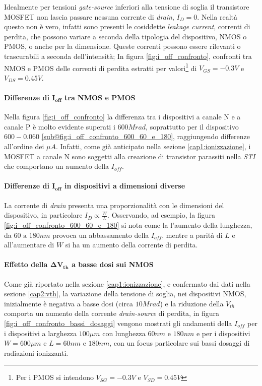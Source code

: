 Idealmente per tensioni \textit{gate-source} inferiori alla tensione di soglia il transistore MOSFET non lascia passare nessuna corrente di \textit{drain}, $I_D = 0$. Nella realtà questo non è vero, infatti sono presenti le cosiddette \textit{leakage current}, correnti di perdita, che possono variare a seconda della tipologia del dispositivo, NMOS o PMOS, o anche per la dimensione.
Queste correnti possono essere rilevanti o trascurabili a seconda dell'intensità; In figura \ref{fig:i_off_confronto}, confronti tra NMOS e PMOS delle correnti di perdita estratti per valori\footnote{Per i PMOS si intendono $V_{SG} = -0.3V$ e $V_{SD} = 0.45V$} di $V_{GS} = -0.3V$ e $V_{DS} = 0.45V$.

\paragraph*{Differenze di $\bm{I_{off}}$ tra NMOS e PMOS} Nella figura \ref{fig:i_off_confronto} la differenza tra i dispositivi a canale N e a canale P è molto evidente superati i $600Mrad$, soprattutto per il dispositivo $600-0.060$ \ref{sub@fig:i_off_confronto_600_60_e_180}, raggiungendo differenze all'ordine dei $\mu A$. Infatti, come già anticipato nella sezione \ref{cap1:ionizzazione}, i MOSFET a canale N sono soggetti alla creazione di transistor parassiti nella \textit{STI} che comportano un aumento della $I_{off}$.

\paragraph*{Differenze di $\bm{I_{off}}$ in dispositivi a dimensioni diverse} La corrente di \textit{drain} presenta una proporzionalità con le dimensioni del dispositivo, in particolare $I_{D} \propto \frac{W}{L}$. Osservando, ad esempio, la figura \ref{fig:i_off_confronto_600_60_e_180} si nota come la l'aumento della lunghezza, da $60 \text{ a } 180nm$ provoca un abbassamento della $I_{off}$, mentre a parità di $L$ e all'aumentare di $W$ si ha un aumento della corrente di perdita.

\paragraph*{Effetto della $\bm{\Delta V_{th}}$ a basse dosi sui NMOS} Come già riportato nella sezione \ref{cap1:ionizzazione}, e confermato dai dati nella sezione \ref{cap2:vth}, la variazione della tensione di soglia, nei dispositivi NMOS, inizialmente è negativa a basse dosi (circa $10Mrad$) e la riduzione della $V_{th}$ comporta un aumento della corrente \textit{drain-source} di perdita, in figura \ref{fig:i_off_confronto_bassi_dosaggi} vengono mostrati gli andamenti della $I_{off}$ per i dispositivi a larghezza $100\mu m$ con lunghezza $60 nm \text{ e } 180nm$ e per i dispositivi $W = 600\mu m$ e $L = 60 nm \text{ e } 180nm$, con un focus particolare sui bassi dosaggi di radiazioni ionizzanti.


